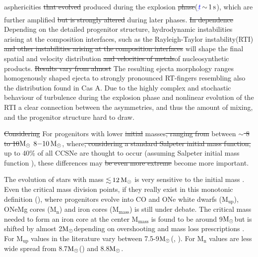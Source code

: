 \documentclass[fleqn,usenatbib]{mnras}
\newcommand{\solm}{\xspace\ensuremath{\rm{M_{\odot}}}}
\newcommand{\NY}[2]{{\color{blue}\sout{#1}#2}}
\begin{document}
asphericities \NY{that evolved}{ produced} during the explosion \NY{phase} ($\NY{}{t}\,\mathord{\sim}\, 1\, \rm s$)\NY{}{,} \NY{}{which are further amplified} \NY{but is strongly altered}{} during later phases. \NY{In dependence}{ Depending} on the detailed progenitor structure, \NY{}{hydrodynamic instabilities arising at the composition interfaces, such as the} Rayleigh-Taylor \NY{}{instability}(RTI) \NY{and other  instabilities arising at the composition interfaces}{} will shape the final \NY{}{spatial and velocity} distribution \NY{and velocities of metals}{of nucleosynthetic products}. \NY{Results vary from almost}{ The resulting ejecta morphology ranges} homogenously shaped ejecta to strongly pronounced RT-fingers resembling also the  distribution found in Cas A. Due to the highly complex and stochastic behaviour of turbulence during the explosion phase and nonlinear evolution of the RTI a clear connection between the asymmetries, and thus the amount of mixing, and the progenitor structure hard to draw.

\NY{Considering}{ For progenitors with} lower \NY{initial}{} masses\NY{, ranging from}{ between} \NY{$\sim$ 8 to 10\solm}{ $8\mathord{-}10\, \solm$,} where\NY{, considering a standard Salpeter initial mass function,}{} up to 40\% of all CCSNe are thought to occur \NY{}{(assuming Salpeter initial mass function  \citep{Salpeter_1955})}, these differences may \NY{be even more extreme}{ become more important}. 

The evolution of stars with mass $\mathord{\lesssim}\,12\, \solm$ is very sensitive to the initial mass \citep{Woosley2015}.
Even the critical mass division points, if they really exist in this monotonic definition (\cite{Woosley2015}), where progenitors evolve into CO and ONe white dwarfs ($\mathrm{M_{up}}$), ONeMg cores ($\mathrm{M_{n}}$) and iron cores ($\mathrm{M_{mass}}$) is still under debate. 
The critical mass needed to form an iron core at the center $\mathrm{M_{mass}}$ is found to be around 9\solm but is shifted by almost 2\solm depending on overshooting and mass loss prescriptions \cite{Siess2007}. 
For $\mathrm{M_{up}}$ values in the literature vary between 7.5-9\solm (\cite{Poelarends2008},  \cite{Siess2007EvolutionAGBstars}). For $\mathrm{M_{n}}$ values are less wide spread from 8.7\solm (\cite{Jones2013}) and 8.8\solm \cite{Nomoto1984EvolutionCores}.
\end{document}
